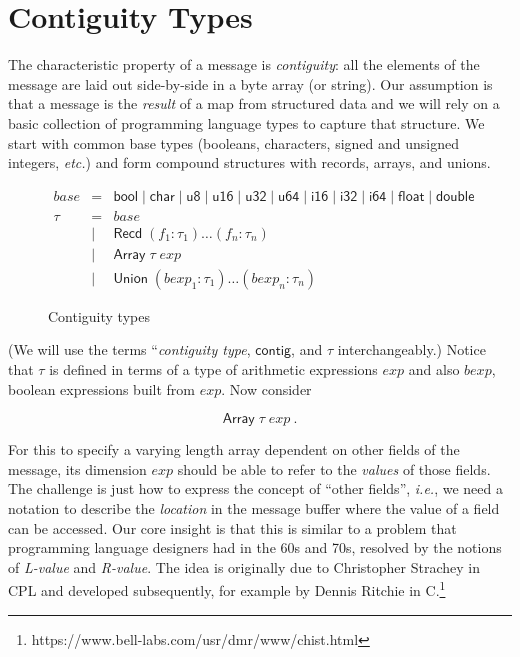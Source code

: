 \documentclass[svgnames]{llncs}
\newcommand{\ie}{\textit{i.e.}}
\newcommand{\etc}{\textit{etc.}}
\newcommand{\konst}[1]{\ensuremath{\mathsf{#1}}}
\begin{document}
\section {Contiguity Types}

The characteristic property of a message is \emph{contiguity}: all the
elements of the message are laid out side-by-side in a byte array (or
string). Our assumption is that a message is the \emph{result} of a
map from structured data and we will rely on a basic collection of
programming language types to capture that structure. We start with
common base types (booleans, characters, signed and unsigned integers,
\etc) and form compound structures with records, arrays, and unions.

\begin{figure}
\[
\begin{array}{rcl}
 \mathit{base} & = & \konst{bool} \mid \konst{char} \mid \konst{u8} \mid
 \konst{u16} \mid \konst{u32} \mid \konst{u64}  \mid \konst{i16} \mid
 \konst{i32} \mid \konst{i64} \mid \konst{float} \mid \konst{double} \\
 \tau & = & \mathit{base} \\
      & \mid & \konst{Recd}\; (f_1 : \tau_1) \ldots (f_n : \tau_n) \\
      & \mid & \konst{Array}\; \tau \; \mathit{exp} \\
      & \mid & \konst{Union}\; (\mathit{bexp}_1 : \tau_1) \ldots (\mathit{bexp}_n : \tau_n)
\end{array}
\]
\label{contig-types}
\caption{Contiguity types}
\end{figure}

\noindent (We will use the terms ``\emph{contiguity type},
\konst{contig}, and $\tau$ interchangeably.) Notice that $\tau$ is
defined in terms of a type of arithmetic expressions $\mathit{exp}$
and also $\mathit{bexp}$, boolean expressions built from
$\mathit{exp}$. Now consider

\[
 \konst{Array} \; \tau \; \mathit{exp} \ .
\]

\noindent For this to specify a varying length array dependent on
other fields of the message, its dimension $\mathit{exp}$ should be
able to refer to the \emph{values} of those fields. The challenge is
just how to express the concept of ``other fields'', \ie, we need a
notation to describe the \emph{location} in the message buffer where
the value of a field can be accessed. Our core insight is that this is
similar to a problem that programming language designers had in the
60s and 70s, resolved by the notions of \emph{L-value} and
\emph{R-value}. The idea is originally due to Christopher Strachey in
CPL and developed subsequently, for example by Dennis Ritchie in
C.\footnote{https://www.bell-labs.com/usr/dmr/www/chist.html}
\end{document}
